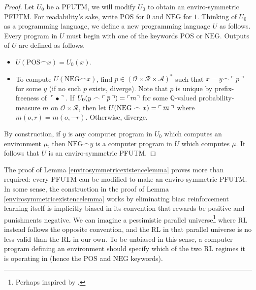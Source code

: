 \documentclass{article}
\begin{document}
\begin{proof}
    Let $U_0$ be a PFUTM, we will modify $U_0$ to obtain an enviro-symmetric PFUTM.
    For readability's sake, write $\mathrm{POS}$ for $0$ and $\mathrm{NEG}$ for $1$.
    Thinking of $U_0$ as a programming language, we define a new programming language
    $U$ as follows. Every program in $U$ must begin with one of the keywords
    $\mathrm{POS}$ or $\mathrm{NEG}$. Outputs of $U$ are defined as follows.
    \begin{itemize}
        \item $U(\mathrm{POS}\frown x)=U_0(x)$.
        \item To compute $U(\mathrm{NEG}\frown x)$, find
        $p\in (\mathcal O\times \mathcal R\times\mathcal A)^*$ such that
        $x=y\frown \ulcorner p\urcorner$ for some $y$ (if no such $p$ exists, diverge).
        Note that $p$ is unique by prefix-freeness of $\ulcorner\bullet\urcorner$.
        If $U_0(y\frown
            \ulcorner \hspace{.2em} \overline p\hspace{.2em}\urcorner)=\ulcorner m\urcorner$
        for some $\mathbb Q$-valued probability-measure $m$ on
        $\mathcal O\times\mathcal R$, then let
        $U(\mathrm{NEG}\frown x)=\ulcorner\hspace{.2em} \overline m\hspace{.2em}\urcorner$ where
        $\overline m(o,r)=m(o,-r)$.
        Otherwise, diverge.
    \end{itemize}
    By construction, if $y$ is any computer program in $U_0$ which computes
    an environment $\mu$, then $\mathrm{NEG}\frown y$ is a computer program in
    $U$ which computes $\overline\mu$. It follows that $U$ is an enviro-symmetric
    PFUTM.
\end{proof}

The proof of Lemma \ref{envirosymmetricexistencelemma} proves more than required:
every PFUTM can be modified to make an enviro-symmetric PFUTM. In some sense,
the construction in the proof of Lemma \ref{envirosymmetricexistencelemma} works
by eliminating bias: reinforcement learning itself is implicitly biased in its
convention that rewards be positive and punishments negative. We can imagine
a pessimistic parallel universe\footnote{Perhaps inspired by \cite{foucault2012discipline}.}
where RL instead follows the opposite convention, and the
RL in that parallel universe is no less valid than the RL in our own. To be
unbiased in this sense, a computer program defining an environment
should specify which of the two RL regimes it is operating in (hence the
$\mathrm{POS}$ and $\mathrm{NEG}$ keywords).
\end{document}
